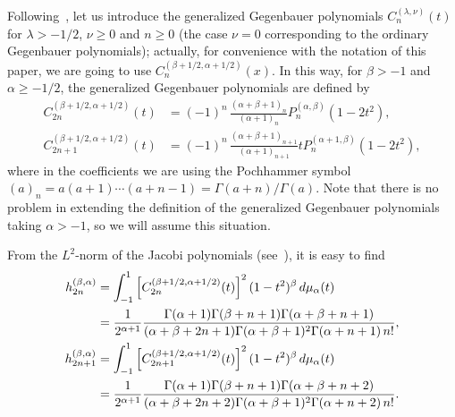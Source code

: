 \documentclass[11pt,a4paper]{amsart}
\theoremstyle{plain}
\theoremstyle{definition}
\begin{document}
Following~\cite[Definition~1.5.5, p.~27]{DX}, let us introduce the generalized
Gegenbauer polynomials $C_n^{(\lambda,\nu)}(t)$ for $\lambda>-1/2$, $\nu \ge 0$
and $n \ge 0$
(the case $\nu=0$ corresponding to the ordinary Gegenbauer polynomials);
actually, for convenience with the notation of this paper,
we are going to use $C_n^{(\beta+1/2,\alpha+1/2)}(x)$. In this way, for $\beta>-1$
and $\alpha\ge -1/2$, the generalized Gegenbauer polynomials are defined by
\begin{align}
\label{eq:C2n}
C_{2n}^{(\beta+1/2,\alpha+1/2)}(t)
&= (-1)^n\,\frac{(\alpha+\beta+1)_n}{(\alpha+1)_n} P_n^{(\alpha,\beta)}(1-2t^2), \\
\label{eq:C2n1}
C_{2n+1}^{(\beta+1/2,\alpha+1/2)}(t)
&= (-1)^n\,\frac{(\alpha+\beta+1)_{n+1}}{(\alpha+1)_{n+1}} t P_n^{(\alpha+1,\beta)}(1-2t^2),
\end{align}
where in the coefficients we are using the Pochhammer symbol
$(a)_n = a(a+1)\cdots(a+n-1) = \Gamma(a+n)/\Gamma(a)$. Note that there is no problem in
extending the definition of the generalized Gegenbauer polynomials taking $\alpha>-1$, 
so we will assume this situation.

From the $L^2$-norm of the Jacobi polynomials (see~\cite[Ch.~16.4,
(5), p.~285]{E-TIT-II}), it is easy to find
\begin{align}
\label{eq:hC2n}
  h_{2n}^{(\beta,\alpha)} &= \int_{-1}^1 \left[C_{2n}^{(\beta+1/2,\alpha+1/2)}(t)\right]^2
  (1-t^2)^\beta \,d\mu_\alpha(t) \\
  &= \frac{1}{2^{\alpha+1}} 
  \frac{\Gamma(\alpha+1)\Gamma(\beta+n+1)\Gamma(\alpha+\beta+n+1)}{(\alpha+\beta+2n+1)
  \Gamma(\alpha+\beta+1)^2 \Gamma(\alpha+n+1)\, n!},
\notag \\
\label{eq:hC2n1}
  h_{2n+1}^{(\beta,\alpha)} &= \int_{-1}^1 \left[C_{2n+1}^{(\beta+1/2,\alpha+1/2)}(t)\right]^2
  (1-t^2)^\beta \,d\mu_\alpha(t) \\
  &= \frac{1}{2^{\alpha+1}} \frac{\Gamma(\alpha+1)\Gamma(\beta+n+1)\Gamma(\alpha+\beta+n+2)}
  {(\alpha+\beta+2n+2) \Gamma(\alpha+\beta+1)^2 \Gamma(\alpha+n+2)\, n!}.
\notag
\end{align}
\end{document}
